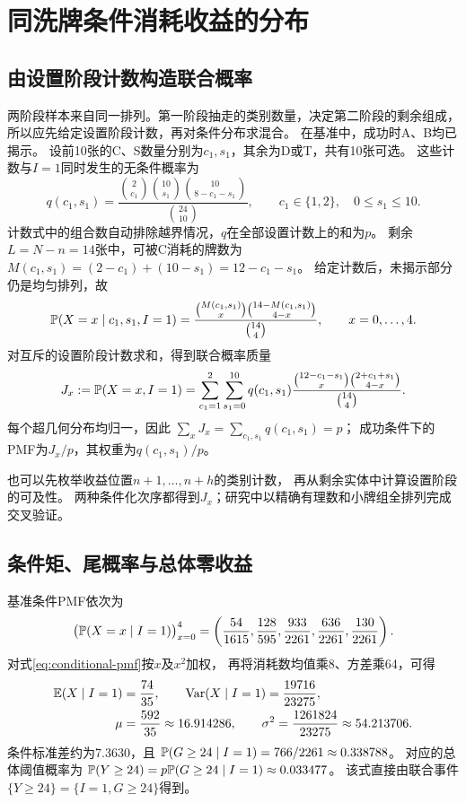 \section{同洗牌条件消耗收益的分布}\label{sec:conditional}
\subsection{由设置阶段计数构造联合概率}
两阶段样本来自同一排列。第一阶段抽走的类别数量，决定第二阶段的剩余组成，
所以应先给定设置阶段计数，再对条件分布求混合。
在基准中，成功时A、B均已揭示。
设前10张的C、S数量分别为$c_1,s_1$，其余为D或T，共有10张可选。
这些计数与$I=1$同时发生的无条件概率为
\begin{equation}\label{eq:setup-counts}
q(c_1,s_1)=
\frac{\binom2{c_1}\binom{10}{s_1}\binom{10}{8-c_1-s_1}}{\binom{24}{10}},
\qquad c_1\in\{1,2\},\quad 0\le s_1\le10.
\end{equation}
计数式中的组合数自动排除越界情况，$q$在全部设置计数上的和为$p$。
剩余$L=N-n=14$张中，可被C消耗的牌数为
$M(c_1,s_1)=(2-c_1)+(10-s_1)=12-c_1-s_1$。
给定计数后，未揭示部分仍是均匀排列，故
\begin{equation}\label{eq:hypergeometric}
\mathbb P(X=x\mid c_1,s_1,I=1)=
\frac{\binom{M(c_1,s_1)}x\binom{14-M(c_1,s_1)}{4-x}}{\binom{14}4},
\qquad x=0,\ldots,4.
\end{equation}
对互斥的设置阶段计数求和，得到联合概率质量
\begin{equation}\label{eq:joint}
J_x:=\mathbb P(X=x,I=1)=
\sum_{c_1=1}^2\sum_{s_1=0}^{10}q(c_1,s_1)
\frac{\binom{12-c_1-s_1}x\binom{2+c_1+s_1}{4-x}}{\binom{14}4}.
\end{equation}
每个超几何分布均归一，因此
$\sum_xJ_x=\sum_{c_1,s_1}q(c_1,s_1)=p$；
成功条件下的PMF为$J_x/p$，其权重为$q(c_1,s_1)/p$。

也可以先枚举收益位置$n+1,\ldots,n+h$的类别计数，
再从剩余实体中计算设置阶段的可及性。
两种条件化次序都得到$J_x$；研究中以精确有理数和小牌组全排列完成交叉验证。

\subsection{条件矩、尾概率与总体零收益}
基准条件PMF依次为
\begin{equation}\label{eq:conditional-pmf}
\bigl(\mathbb P(X=x\mid I=1)\bigr)_{x=0}^4
=\left(\frac{54}{1615},\frac{128}{595},\frac{933}{2261},
        \frac{636}{2261},\frac{130}{2261}\right).
\end{equation}
对式\eqref{eq:conditional-pmf}按$x$及$x^2$加权，
再将消耗数均值乘8、方差乘64，可得
\begin{equation}\label{eq:conditional-moments}
\begin{aligned}
\mathbb E(X\mid I=1)&=\frac{74}{35},\qquad
\operatorname{Var}(X\mid I=1)=\frac{19716}{23275},\\
\mu&=\frac{592}{35}\approx16.914286,\qquad
\sigma^2=\frac{1261824}{23275}\approx54.213706.
\end{aligned}
\end{equation}
条件标准差约为7.3630，且
$\mathbb P(G\ge24\mid I=1)=766/2261\approx0.338788$。
对应的总体阈值概率为
$\mathbb P(Y\ge24)=p\mathbb P(G\ge24\mid I=1)\approx0.033477$。
该式直接由联合事件$\{Y\ge24\}=\{I=1,G\ge24\}$得到。


